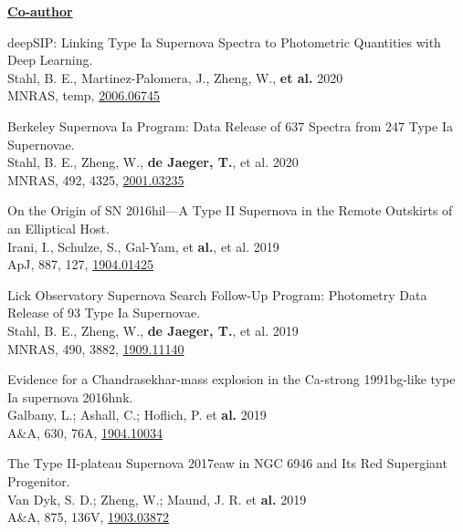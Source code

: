 \documentclass[12pt]{article}
\begin{document}
\vspace{0.8cm}
\underline{\textbf{Co-author}}
\vspace{0.2cm}
\begin{bibenum}

    \item 
deepSIP: Linking Type Ia Supernova Spectra to Photometric Quantities with Deep Learning.\\
Stahl, B. E., Martinez-Palomera, J., Zheng, W., \textbf{et al.} 2020\\
MNRAS, temp, \href{https://arxiv.org/abs/2006.06745}{2006.06745}

    \item 
Berkeley Supernova Ia Program: Data Release of 637 Spectra from 247 Type Ia Supernovae.\\
Stahl, B. E., Zheng, W., \textbf{de Jaeger, T.}, et al. 2020\\
MNRAS, 492, 4325, \href{https://arxiv.org/abs/2001.03235}{2001.03235}


    \item 
On the Origin of SN 2016hil—A Type II Supernova in the Remote Outskirts of an Elliptical Host.\\
Irani, I., Schulze, S., Gal-Yam, et \textbf{al.}, et al. 2019\\
ApJ, 887, 127, \href{https://arxiv.org/abs/1904.01425}{1904.01425}

    \item 
Lick Observatory Supernova Search Follow-Up Program: Photometry Data Release of 93 Type Ia Supernovae.\\
Stahl, B. E., Zheng, W., \textbf{de Jaeger, T.}, et al. 2019\\
MNRAS, 490, 3882, \href{https://arxiv.org/abs/1909.11140}{1909.11140}


\item 
Evidence for a Chandrasekhar-mass explosion in the Ca-strong 1991bg-like type Ia supernova 2016hnk.\\
Galbany, L.; Ashall, C.; Hoflich, P.  et \textbf{al.} 2019\\
A\&A, 630, 76A, \href{https://arxiv.org/abs/1904.10034}{1904.10034}

\item 
The Type II-plateau Supernova 2017eaw in NGC 6946 and Its Red Supergiant Progenitor.\\
Van Dyk, S. D.; Zheng, W.; Maund, J. R.  et \textbf{al.} 2019\\
A\&A, 875, 136V, \href{https://arxiv.org/abs/1903.03872}{1903.03872}


\end{bibenum}
\end{document}
